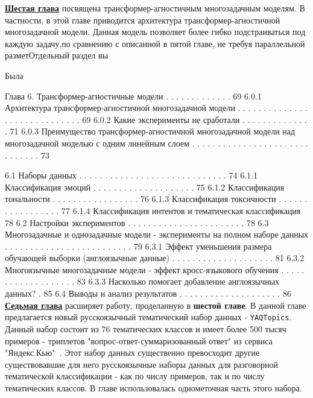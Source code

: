\underline{\textbf{Шестая глава}} посвящена трансформер-агностичным многозадачным моделям. В частности, в этой главе приводится архитектура трансформер-агностичной многозадачной модели. Данная модель позволяет более гибко подстраиваться под каждую задачу,по сравнению с описанной в пятой главе, не требуя параллельной разметОтдельный раздел вы

Была 

Глава 6. Трансформер-агностичные модели . . . . . . . . . . . . . 69
6.0.1 Архитектура трансформер-агностичной многозадачной
модели . . . . . . . . . . . . . . . . . . . . . . . . . . . . . 69
6.0.2 Какие эксперименты не сработали . . . . . . . . . . . . . . 71
6.0.3 Преимущество трансформер-агностичной многозадачной
модели над многозадачной моделью с одним линейным
слоем . . . . . . . . . . . . . . . . . . . . . . . . . . . . . . 73

6.1 Наборы данных . . . . . . . . . . . . . . . . . . . . . . . . . . . . . 74
6.1.1 Классификация эмоций . . . . . . . . . . . . . . . . . . . . 75
6.1.2 Классификация тональности . . . . . . . . . . . . . . . . . 76
6.1.3 Классификация токсичности . . . . . . . . . . . . . . . . . 77
6.1.4 Классификация интентов и тематическая классификация 78
6.2 Настройки экспериментов . . . . . . . . . . . . . . . . . . . . . . . 78
6.3 Многозадачные и однозадачные модели - эксперименты на
полном наборе данных . . . . . . . . . . . . . . . . . . . . . . . . . 79
6.3.1 Эффект уменьшения размера обучающей выборки
(англоязычные данные) . . . . . . . . . . . . . . . . . . . . 81
6.3.2 Многоязычные многозадачные модели - эффект
кросс-языкового обучения . . . . . . . . . . . . . . . . . . . 83
6.3.3 Насколько помогает добавление англоязычных данных? . 85
6.4 Выводы и анализ результатов . . . . . . . . . . . . . . . . . . . . 86
\underline{\textbf{Седьмая глава}} расширяет работу, проделанную в \textbf{шестой главе}. В данной главе предлагается новый русскоязычный тематический набор данных - \texttt{YAQTopics}.  Данный набор состоит из 76 тематических классов и имеет более 500 тысяч примеров - триплетов "вопрос-ответ-суммаризованный ответ" из сервиса "Яндекс.Кью"~\cite{yandex_q}. Этот набор данных существенно превосходит другие существовавшие для него русскоязычные наборы данных для разговорной тематической классификации - как по числу примеров, так и по числу тематических классов. В главе использовалась однометочная часть этого набора. 

